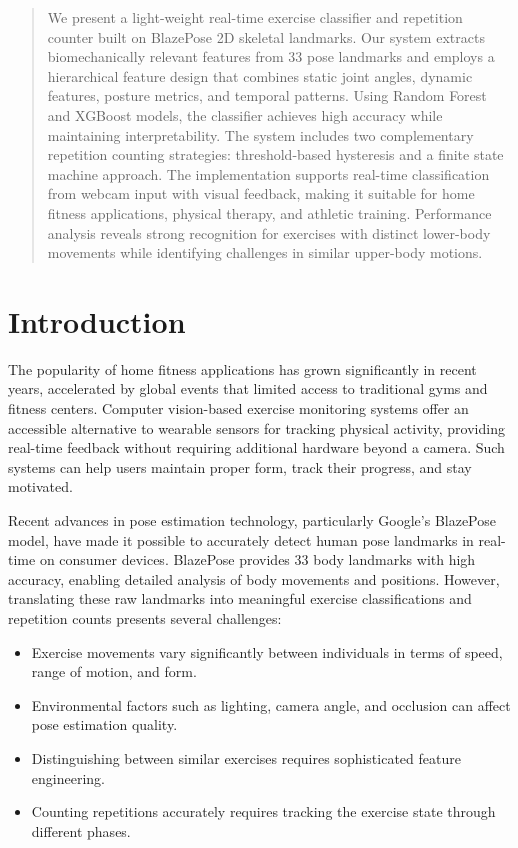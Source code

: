 \documentclass[conference]{IEEEtran}
\author{Atharv Khisti, Co-author 1, Co-author 2, Guide / Supervisor\\[2pt]\small Department / Institute, University, City, Country}
\begin{document}
\maketitle

\begin{abstract}
We present a light-weight real-time exercise classifier and repetition counter built on BlazePose 2D skeletal landmarks. Our system extracts biomechanically relevant features from 33 pose landmarks and employs a hierarchical feature design that combines static joint angles, dynamic features, posture metrics, and temporal patterns. Using Random Forest and XGBoost models, the classifier achieves high accuracy while maintaining interpretability. The system includes two complementary repetition counting strategies: threshold-based hysteresis and a finite state machine approach. The implementation supports real-time classification from webcam input with visual feedback, making it suitable for home fitness applications, physical therapy, and athletic training. Performance analysis reveals strong recognition for exercises with distinct lower-body movements while identifying challenges in similar upper-body motions.
\end{abstract}

\section{Introduction}
The popularity of home fitness applications has grown significantly in recent years, accelerated by global events that limited access to traditional gyms and fitness centers. Computer vision-based exercise monitoring systems offer an accessible alternative to wearable sensors for tracking physical activity, providing real-time feedback without requiring additional hardware beyond a camera. Such systems can help users maintain proper form, track their progress, and stay motivated.

Recent advances in pose estimation technology, particularly Google's BlazePose model, have made it possible to accurately detect human pose landmarks in real-time on consumer devices. BlazePose provides 33 body landmarks with high accuracy, enabling detailed analysis of body movements and positions. However, translating these raw landmarks into meaningful exercise classifications and repetition counts presents several challenges:

\begin{itemize}
    \item Exercise movements vary significantly between individuals in terms of speed, range of motion, and form.
    \item Environmental factors such as lighting, camera angle, and occlusion can affect pose estimation quality.
    \item Distinguishing between similar exercises requires sophisticated feature engineering.
    \item Counting repetitions accurately requires tracking the exercise state through different phases.
\end{itemize}
\end{document}
